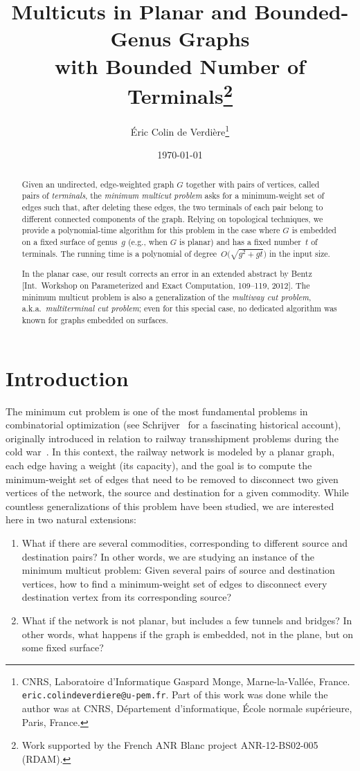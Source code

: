 \documentclass[11pt]{article}
\title{Multicuts in Planar and Bounded-Genus Graphs\\ with Bounded Number of
  Terminals\thanks{Work supported by the French ANR Blanc project
    ANR-12-BS02-005 (RDAM).}}
\author{\'Eric Colin de Verdi\`ere\thanks{CNRS, Laboratoire d'Informatique
    Gaspard Monge, Marne-la-Vall\'ee, France.
    \texttt{eric.colindeverdiere}\texttt{@u-pem.fr}.  Part of this work was
    done while the author was at CNRS, D\'epartement d'informatique,
    \'Ecole normale sup\'erieure, Paris, France.}}
\date{\today}
\theoremstyle{plain}  \newtheorem{theorem}{Theorem}[section]
\theoremstyle{definition}
\begin{document}
\maketitle

\begin{abstract}
  Given an undirected, edge-weighted graph $G$ together with pairs of
  vertices, called pairs of \emph{terminals}, the \emph{minimum multicut
    problem} asks for a minimum-weight set of edges such that, after
  deleting these edges, the two terminals of each pair belong to different
  connected components of the graph.  Relying on topological techniques, we
  provide a polynomial-time algorithm for this problem in the case where
  $G$ is embedded on a fixed surface of genus~$g$ (e.g., when $G$ is
  planar) and has a fixed number~$t$ of terminals.  The running time is a
  polynomial of degree~$O\big(\sqrt{g^2+gt}\big)$ in the input size.

  In the planar case, our result corrects an error in an extended abstract
  by Bentz [Int.\ Workshop on Parameterized and Exact Computation,
  109--119, 2012].  The minimum multicut problem is also a generalization
  of the \emph{multiway cut problem}, a.k.a.\ \emph{multiterminal cut
    problem}; even for this special case, no dedicated algorithm was known
  for graphs embedded on surfaces.
\end{abstract}

\section{Introduction}\label{S:intro}

The minimum cut problem is one of the most fundamental problems in
combinatorial optimization (see Schrijver~\cite{s-hcot-05} for a
fascinating historical account), originally introduced in relation to
railway transshipment problems during the cold war~\cite{hr-fmern-55}.  In
this context, the railway network is modeled by a planar graph, each edge
having a weight (its capacity), and the goal is to compute the
minimum-weight set of edges that need to be removed to disconnect two given
vertices of the network, the source and destination for a given commodity.
While countless generalizations of this problem have been studied, we are
interested here in two natural extensions:
\begin{enumerate}
\item What if there are several commodities, corresponding to different
  source and destination pairs?  In other words, we are studying an instance
  of the minimum multicut problem: Given several pairs of source and
  destination vertices, how to find a minimum-weight set of edges to
  disconnect every destination vertex from its corresponding source?
\item What if the network is not planar, but includes a few tunnels and
  bridges?  In other words, what happens if the graph is embedded, not in
  the plane, but on some fixed surface?
\end{enumerate}
\end{document}

